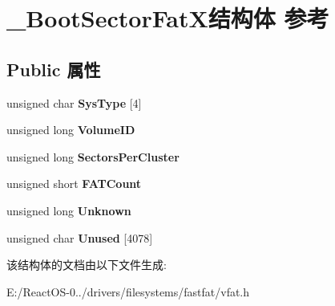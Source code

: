 \hypertarget{struct___boot_sector_fat_x}{}\section{\+\_\+\+Boot\+Sector\+Fat\+X结构体 参考}
\label{struct___boot_sector_fat_x}
\subsection*{Public 属性}
\begin{DoxyCompactItemize}
\item 
\mbox{\label{struct___boot_sector_fat_x_a72cc48f9befaf5b3ce2eea795298b3e8}} 
unsigned char {\bfseries Sys\+Type} \mbox{[}4\mbox{]}
\item 
\mbox{\label{struct___boot_sector_fat_x_ac8c8b918a30411797c0ce37feb27b60d}} 
unsigned long {\bfseries Volume\+ID}
\item 
\mbox{\label{struct___boot_sector_fat_x_a7eff0dcf3b5646d04a59a5ce7e620439}} 
unsigned long {\bfseries Sectors\+Per\+Cluster}
\item 
\mbox{\label{struct___boot_sector_fat_x_aac1fb766618a96744719873edc313df9}} 
unsigned short {\bfseries F\+A\+T\+Count}
\item 
\mbox{\label{struct___boot_sector_fat_x_a51a5c1f18a806cb95a766deeb43310fc}} 
unsigned long {\bfseries Unknown}
\item 
\mbox{\label{struct___boot_sector_fat_x_a1a007b3abf34f2621809a646d9e94b88}} 
unsigned char {\bfseries Unused} \mbox{[}4078\mbox{]}
\end{DoxyCompactItemize}


该结构体的文档由以下文件生成\+:\begin{DoxyCompactItemize}
\item 
E\+:/\+React\+O\+S-\/0../drivers/filesystems/fastfat/vfat.\+h\end{DoxyCompactItemize}
